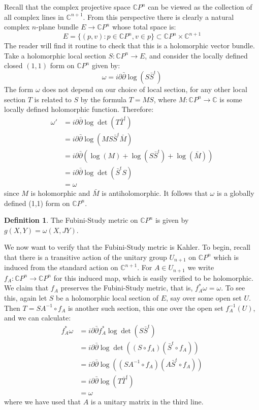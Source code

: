 \documentclass[11pt]{amsart}
\theoremstyle{definition}
\newtheorem{definition}[subsection]{Definition}
\def \CP{ \mathbb{C}P }
\def \C{ \mathbb{C} }
\def \del{ \partial }
\def \delbar{ \bar{\partial} }
\begin{document}
Recall that the complex projective space $\CP^n$ can be viewed as the collection of all complex lines in $\C^{n+1}$.  From this perspective there is clearly a natural complex $n$-plane bundle $E \rightarrow \CP^n$ whose total space is:
%
$$ E = \{ (p,v) : p \in \CP^n, v \in p \} \subset \CP^n \times \C^{n+1} $$
%
The reader will find it routine to check that this is a holomorphic vector bundle.  Take a holomorphic local section $S: \CP^n \rightarrow E$, and consider the locally defined closed $(1,1)$ form on $\CP^n$ given by:
%
$$ \omega = i \del \delbar \log ( S \bar{S}^{t} ) $$
%
The form $\omega$ does not depend on our choice of local section, for any other local section $T$ is related to $S$ by the formula $T = M S $, where $M: \CP^n \rightarrow \C $ is some locally defined holomorphic function.  Therefore:
%
\begin{align*} \omega' &= i \del \delbar \log \det ( T \bar{T}^{t} ) \\
&= i \del \delbar \log ( M S \bar{S}^t \bar{M} ) \\
&= i \del \delbar( \log ( M ) + \log( S \bar{S}^t ) + \log( \bar{M} ) ) \\
&= i \del \delbar \log \det ( \bar{S}^{t} S ) \\
&= \omega
\end{align*}
%
since $M$ is holomorphic and $\bar{M}$ is antiholomorphic.  It follows that $\omega$ is a globally defined (1,1) form on $\CP^n$.
%
\begin{definition} The Fubini-Study metric on $\CP^n$ is given by $g(X,Y) = \omega(X,JY)$.
\end{definition}
%
We now want to verify that the Fubini-Study metric is Kahler.  To begin, recall that there is a transitive action of the unitary group $U_{n+1}$ on $\CP^n$ which is induced from the standard action on $\C^{n+1}$.  For $A \in U_{n+1}$ we write $f_{A}: \CP^n \rightarrow \CP^n$ for this induced map, which is easily verified to be holomorphic.  We claim that $f_A$ preserves the Fubini-Study metric, that is, $f^{\ast}_A \omega = \omega$.  To see this, again let $S$ be a holomorphic local section of $E$, say over some open set $U$.  Then $T = S A^{-1} \circ f_A$ is another such section, this one over the open set $f_A^{-1}(U)$, and we can calculate:
%
\begin{align*} f^{\ast}_A \omega &= i \del \delbar f^{\ast}_A \log \det ( S \bar{S}^t ) \\
&= i \del \delbar \log \det ( ( S \circ f_A ) ( \bar{S}^t \circ f_A ) ) \\
&= i \del \delbar \log ( ( S A^{-1} \circ f_A ) ( A \bar{S}^t \circ f_A ) ) \\
&= i \del \delbar \log ( T \bar{T}^t ) \\
&= \omega 
\end{align*}
%
where we have used that $A$ is a unitary matrix in the third line.
\end{document}
